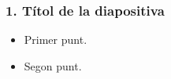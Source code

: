 \documentclass[aspectratio=169]{beamer}
\newcommand{\caixatitol}[1]{%
  \begin{center}%
    \begin{caixadef}[titular]#1\end{caixadef}%
  \end{center}%
}
\newcommand{\caixacentrada}[1]{\caixatitol{#1}}
\newcommand{\fc}[1]{{\color{margueVerdFosc}#1}}
\begin{document}
\begin{frame}[t]
  \frametitle{1. Títol de la diapositiva}

  \begin{itemize}
    \item<1-> Primer punt.
    \item<2-> Segon punt.
  \end{itemize}






\end{frame}
\end{document}
